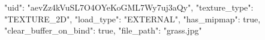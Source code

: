 {
    "uid": "aevZz4kVuSL7O4OYeKoGML7Wy7uj3aQy",
    "texture_type": "TEXTURE_2D",
    "load_type": "EXTERNAL",
    "has_mipmap": true,
    "clear_buffer_on_bind": true,
    "file_path": "grass.jpg"
}